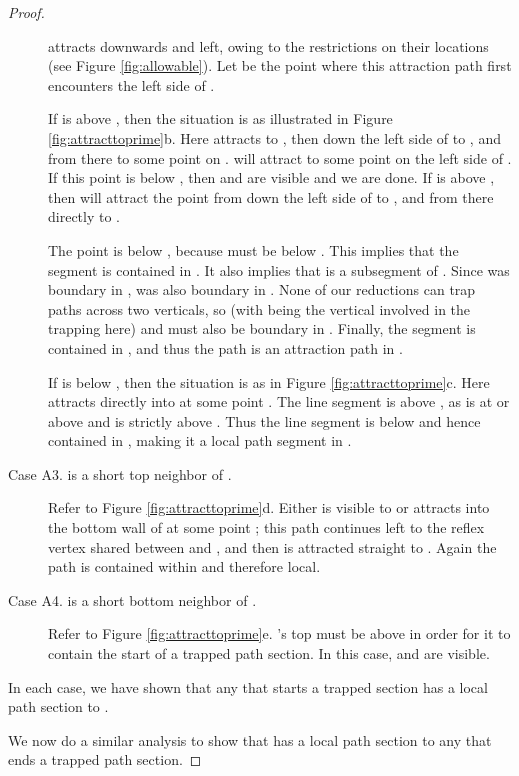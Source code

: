 \documentclass{article}
\begin{document}
\begin{proof}
\begin{description}
			
			 attracts  downwards and left,
			owing to the restrictions on their locations (see Figure
			\ref{fig:allowable}).
			Let  be the point where this attraction path first encounters the left
			side of .
			
			If  is above , then the situation is as illustrated in Figure
			\ref{fig:attracttoprime}b.
			Here  attracts  to , then down the left side of 
			to , and from there to some point  on .
			 will attract  to some point  on the left side of .
			If this point is below , then  and  are visible and we
			are done. If  is above , then  will attract the point from 
			down the left side of  to , and from there directly to .
			
			The point  is below , because  must be below .
			This implies that the segment  is contained in .
			It also implies that  is a subsegment of .
			Since  was boundary in ,  was also boundary
			in .
			None of our reductions can trap paths across two verticals, so (with 
			being the vertical involved in the trapping here)  and  must also
			be boundary in .
			Finally, the segment  is contained in , and thus the path
			 is an attraction path in .
			
			
			If  is below ,  then the situation is as in Figure
			\ref{fig:attracttoprime}c.
			Here  attracts  directly into  at some point .
			The line segment  is above , as  is at or above and
			 is strictly above .  Thus the line segment  is
			below  and hence contained in , making it a local path
			segment in .

		
		\item[Case A3.  is a short top neighbor of .]
			Refer to Figure \ref{fig:attracttoprime}d. 
			Either  is visible to 
			or  attracts  into the bottom wall of  at some point ;
			this
			path continues left to the reflex vertex  shared between  and ,
			and then is attracted straight to .
			Again the path is contained within  and therefore local.
		
		\item[Case A4.  is a short bottom neighbor of .]
			Refer to Figure \ref{fig:attracttoprime}e. 
			's top must be above  in order
			for it to contain the start of a trapped path section.
			In this case,  and  are visible.
		\end{description}
		
		In each case, we have shown that any  that starts a trapped section
		has a local path section to .
		
		We now do a similar analysis to show that  has a local path section to
		any  that ends a trapped path section.
		

\end{proof}
\end{document}
